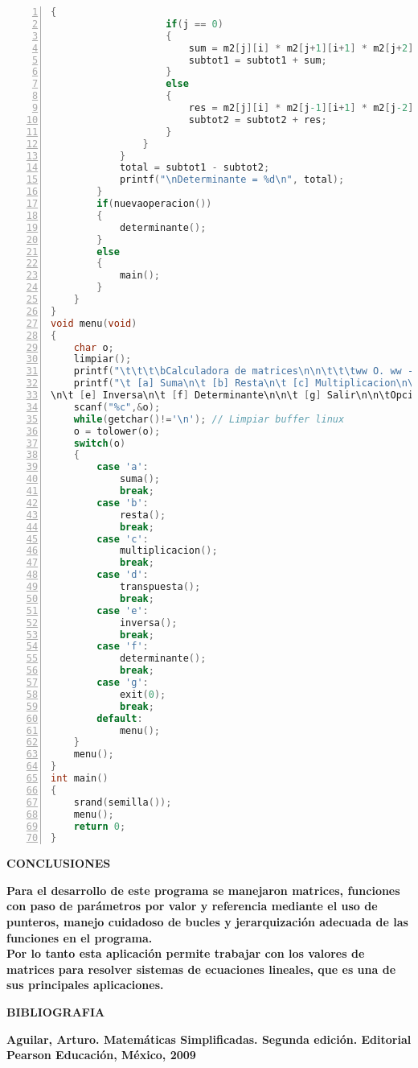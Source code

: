 \documentclass[letterpaper]{article}
\begin{document}
\begin{lstlisting}[language=C, numbers=left, showstringspaces=false, tabsize=3]
				{
					if(j == 0)
					{
						sum = m2[j][i] * m2[j+1][i+1] * m2[j+2][i+2];
						subtot1 = subtot1 + sum;
					}
					else
					{
						res = m2[j][i] * m2[j-1][i+1] * m2[j-2][i+2];
						subtot2 = subtot2 + res;
					}
				}
			}
			total = subtot1 - subtot2;
			printf("\nDeterminante = %d\n", total);
		}
		if(nuevaoperacion())
		{
			determinante();
		}
		else
		{
			main();
		}
	}
}
void menu(void)
{
	char o;
	limpiar();
	printf("\t\t\t\bCalculadora de matrices\n\n\t\t\tww O. ww - 1CM4\n\n\n");
	printf("\t [a] Suma\n\t [b] Resta\n\t [c] Multiplicacion\n\t [d] Transpuesta
\n\t [e] Inversa\n\t [f] Determinante\n\n\t [g] Salir\n\n\tOpcion: ");
	scanf("%c",&o);
	while(getchar()!='\n'); // Limpiar buffer linux
	o = tolower(o);
	switch(o)
	{
		case 'a':
			suma();
			break;
		case 'b':
			resta();
			break;
		case 'c':
			multiplicacion();
			break;
		case 'd':
			transpuesta();
			break;
		case 'e':
			inversa();
			break;
		case 'f':
			determinante();
			break;
		case 'g':
			exit(0);
			break;
		default:
			menu();
	}
	menu();
}
int main()
{
	srand(semilla());
	menu();
	return 0;
}
\end{lstlisting}
\clearpage

\begin{center}
\textbf{\LARGE CONCLUSIONES\\}
\vspace{1.0cm}
\end{center}

\begin{flushleft}
\textbf{\Large Para el desarrollo de este programa se manejaron matrices, funciones con paso de par\'ametros por valor y referencia mediante el uso de punteros, manejo cuidadoso de bucles y jerarquizaci\'on adecuada de las funciones en el programa.\\}
\vspace{0.5cm}
\textbf{\Large Por lo tanto esta aplicaci\'on permite trabajar con los valores de matrices para resolver sistemas de ecuaciones lineales, que es una de sus principales aplicaciones.\\}
\vspace{2.0cm}
\end{flushleft}

\begin{center}
\textbf{\LARGE BIBLIOGRAFIA\\}
\vspace{1.0cm}
\end{center}

\begin{flushleft}
\textbf{\Large Aguilar, Arturo. Matem\'aticas Simplificadas. Segunda edici\'on. Editorial Pearson Educaci\'on, M\'exico, 2009\\}
\end{flushleft}


\clearpage

\thispagestyle{empty}
\end{document}
